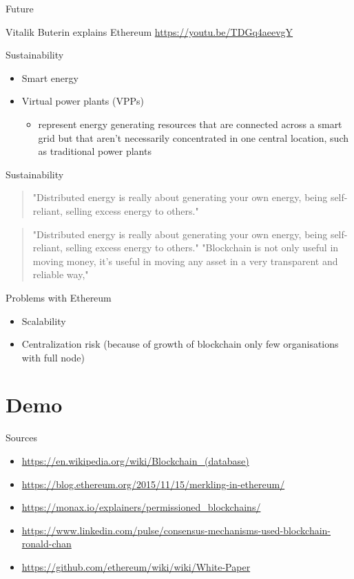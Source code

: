 \documentclass[presentation]{beamer}
\begin{document}
\begin{frame}[label=sec-6-3]{Future}
\begin{alertblock}{Vitalik Buterin explains Ethereum}
\url{https://youtu.be/TDGq4aeevgY}
\end{alertblock}
\end{frame}
\begin{frame}[label=sec-6-4]{Sustainability}
\begin{itemize}
\item Smart energy
\item \alert{Virtual power plants} (VPPs)
\begin{itemize}
\item represent energy generating resources that are connected across a smart grid but \alert{that aren’t necessarily concentrated in one central location}, such as traditional power plants
\end{itemize}
\end{itemize}
\end{frame}
\begin{frame}[label=sec-6-5]{Sustainability}
\begin{quotation}
"Distributed energy is really about generating your own energy, being self-reliant, selling excess energy to others."
\end{quotation}

\begin{quotation}
"Distributed energy is really about generating your own energy, being self-reliant, selling excess energy to others."
"Blockchain is not only useful in moving money, it’s useful in moving any asset in a very transparent and reliable way,"
\end{quotation}
\end{frame}
\begin{frame}[label=sec-6-6]{Problems with Ethereum}
\begin{itemize}
\item \alert{Scalability}
\item \alert{Centralization} risk (because of growth of blockchain only few organisations with full node)
\end{itemize}
\end{frame}

\section{Demo}
\label{sec-7}
\begin{frame}[label=sec-7-1]{Sources}
\begin{itemize}
\item \url{https://en.wikipedia.org/wiki/Blockchain_(database)}
\item \url{https://blog.ethereum.org/2015/11/15/merkling-in-ethereum/}
\item \url{https://monax.io/explainers/permissioned_blockchains/}
\item \url{https://www.linkedin.com/pulse/consensus-mechanisms-used-blockchain-ronald-chan}
\item \url{https://github.com/ethereum/wiki/wiki/White-Paper}
\end{itemize}
\end{frame}
\end{document}
